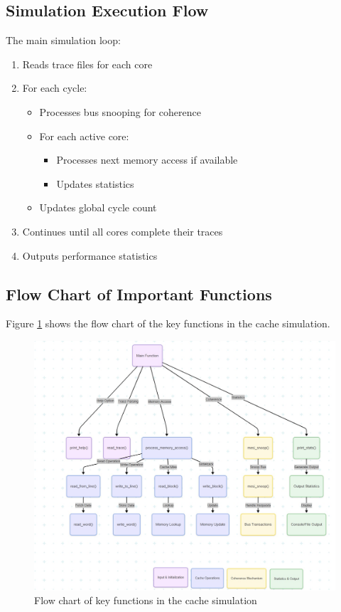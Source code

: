 \documentclass[11pt,a4paper]{article}
\begin{document}
    \subsection{Simulation Execution Flow}
    The main simulation loop:

    \begin{enumerate}[leftmargin=*]
        \item Reads trace files for each core
        \item For each cycle:
            \begin{itemize}
                \item Processes bus snooping for coherence
                \item For each active core:
                    \begin{itemize}
                        \item Processes next memory access if available
                        \item Updates statistics
                    \end{itemize}
                \item Updates global cycle count
            \end{itemize}
        \item Continues until all cores complete their traces
        \item Outputs performance statistics
    \end{enumerate}

    \subsection{Flow Chart of Important Functions}

    Figure \ref{fig:flowchart} shows the flow chart of the key functions in the cache simulation.

    \begin{figure}[H]
        \centering
        \includegraphics[width=\textwidth]{mermaid_flowchart.jpg}
        \caption{Flow chart of key functions in the cache simulation}
        \label{fig:flowchart}
    \end{figure}
\end{document}

